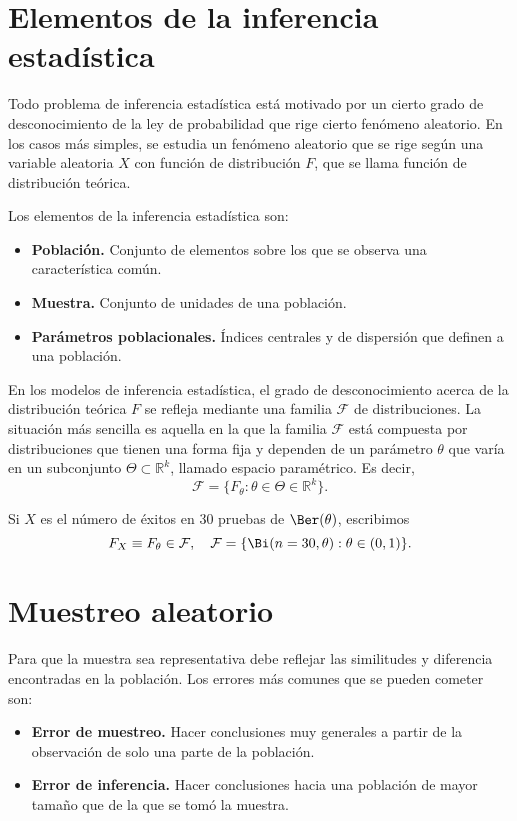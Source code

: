 \section{Elementos de la inferencia estadística}
Todo problema de inferencia estadística está motivado por un cierto grado de desconocimiento de la ley de probabilidad que rige cierto fenómeno aleatorio.
En los casos más simples, se estudia un fenómeno aleatorio que se rige según una variable aleatoria $X$ con función de distribución $F$, que se llama función de distribución teórica.

Los elementos de la inferencia estadística son:
\begin{itemize}
    \item \textbf{Población.}
          Conjunto de elementos sobre los que se observa una característica común.
    \item \textbf{Muestra.}
          Conjunto de unidades de una población.
    \item \textbf{Parámetros poblacionales.}
          Índices centrales y de dispersión que definen a una población.
\end{itemize}

En los modelos de inferencia estadística, el grado de desconocimiento acerca de la distribución teórica $F$ se refleja mediante una familia $\mathcal{F}$ de distribuciones.
La situación más sencilla es aquella en la que la familia $\mathcal{F}$ está compuesta por distribuciones que tienen una forma fija y dependen de un parámetro $\theta$ que varía en un subconjunto $\Theta \subset \mathbb{R}^k$, llamado espacio paramétrico.
Es decir,
$$\mathcal{F} = \{ F_{\theta} : \theta \in \Theta \in \mathbb{R}^k \}.$$

\begin{example}
    Si $X$ es el número de éxitos en 30 pruebas de $\Ber(\theta)$, escribimos
    $$F_X \equiv F_\theta \in \mathcal{F}, \quad \mathcal{F} = \{ \Bi(n = 30, \theta) : \theta \in (0, 1) \}.$$
\end{example}

\section{Muestreo aleatorio}
Para que la muestra sea representativa debe reflejar las similitudes y diferencia encontradas en la población.
Los errores más comunes que se pueden cometer son:
\begin{itemize}
    \item \textbf{Error de muestreo.}
          Hacer conclusiones muy generales a partir de la observación de solo una parte de la población.
    \item \textbf{Error de inferencia.}
          Hacer conclusiones hacia una población de mayor tamaño que de la que se tomó la muestra.
\end{itemize}

